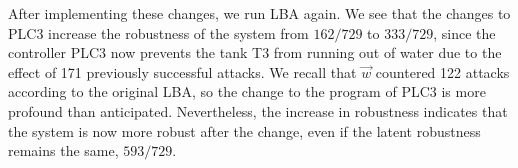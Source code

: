 {After implementing these changes, we run LBA again. We see that the changes to PLC3 increase the robustness of the system from $162/729$ to $333/729$, since the controller PLC3 now prevents the tank T3 from running out of water due to the effect of 171 previously successful attacks. We recall that $\vec{w}$ countered 122 attacks according to the original LBA, so the change to the program of PLC3 is more profound than anticipated. Nevertheless, the increase in robustness indicates that the system is now more robust after the change, even if the latent robustness remains the same, $593/729$. 

 
}
